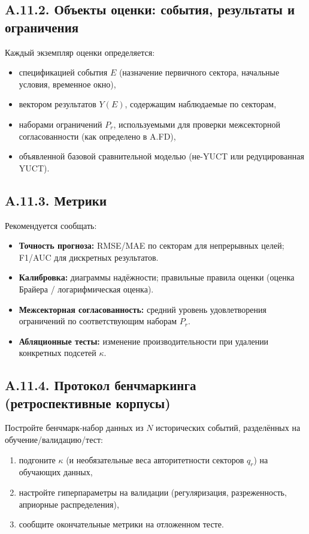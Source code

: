 \documentclass[11pt,a4paper]{article}
\begin{document}
	\subsection*{A.11.2. Объекты оценки: события, результаты и ограничения}
	Каждый экземпляр оценки определяется:
	\begin{itemize}[leftmargin=*]
		\item спецификацией события $E$ (назначение первичного сектора, начальные условия, временное окно),
		\item вектором результатов $Y(E)$, содержащим наблюдаемые по секторам,
		\item наборами ограничений $P_r$, используемыми для проверки межсекторной согласованности (как определено в A.FD),
		\item объявленной базовой сравнительной моделью (не-YUCT или редуцированная YUCT).
	\end{itemize}
	
	\subsection*{A.11.3. Метрики}
	Рекомендуется сообщать:
	\begin{itemize}[leftmargin=*]
		\item \textbf{Точность прогноза:} RMSE/MAE по секторам для непрерывных целей; F1/AUC для дискретных результатов.
		\item \textbf{Калибровка:} диаграммы надёжности; правильные правила оценки (оценка Брайера / логарифмическая оценка).
		\item \textbf{Межсекторная согласованность:} средний уровень удовлетворения ограничений по соответствующим наборам $P_r$.
		\item \textbf{Абляционные тесты:} изменение производительности при удалении конкретных подсетей $\kappa$.
	\end{itemize}
	
	\subsection*{A.11.4. Протокол бенчмаркинга (ретроспективные корпусы)}
	Постройте бенчмарк-набор данных из $N$ исторических событий, разделённых на обучение/валидацию/тест:
	\begin{enumerate}[leftmargin=*]
		\item подгоните $\kappa$ (и необязательные веса авторитетности секторов $q_r$) на обучающих данных,
		\item настройте гиперпараметры на валидации (регуляризация, разреженность, априорные распределения),
		\item сообщите окончательные метрики на отложенном тесте.
	\end{enumerate}
	
\end{document}
